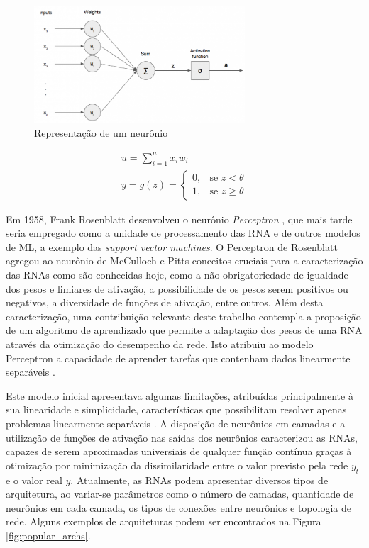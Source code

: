 \begin{figure}[ht]
	\centering
	\includegraphics[width=0.7\textwidth]{img/perceptron.png}
	\caption{Representação de um neurônio}
	\label{fig:neuronio}
\end{figure}

\begin{gather}\label{eq:funcao_neuronio}
	u = \sum_{i=1}^n x_i w_i\\
	y = g(z) =
		\begin{cases}
			0, & \text{se } z < \theta\\
			1, & \text{se } z \geq \theta
		\end{cases}
\end{gather}



Em 1958, Frank Rosenblatt desenvolveu o neurônio \emph{Perceptron} \cite{rosenblatt1958perceptron}, que mais tarde seria empregado como a unidade de processamento das RNA e de outros modelos de ML, a exemplo das \emph{support vector machines}. O Perceptron de Rosenblatt agregou ao neurônio de McCulloch e Pitts conceitos cruciais para a caracterização das RNAs como são conhecidas hoje, como a não obrigatoriedade de igualdade dos pesos e limiares de ativação, a possibilidade de os pesos serem positivos ou negativos, a diversidade de funções de ativação, entre outros. Além desta caracterização, uma contribuição relevante deste trabalho contempla a proposição de um algoritmo de aprendizado que permite a adaptação dos pesos de uma RNA através da otimização do desempenho da rede. Isto atribuiu ao modelo Perceptron a capacidade de aprender tarefas que contenham dados linearmente separáveis \cite{braga2000redes}.

Este modelo inicial apresentava algumas limitações, atribuídas principalmente à sua linearidade e simplicidade, características que possibilitam resolver apenas problemas linearmente separáveis \cite{braga2000redes}. A disposição de neurônios em camadas e a utilização de funções de ativação nas saídas dos neurônios caracterizou as RNAs, capazes de serem aproximadas universiais de qualquer função contínua graças à otimização por minimização da dissimilaridade entre o valor previsto pela rede $y_t$ e o valor real $y$. Atualmente, as RNAs podem apresentar diversos tipos de arquitetura, ao variar-se parâmetros como o número de camadas, quantidade de neurônios em cada camada, os tipos de conexões entre neurônios e topologia de rede. Alguns exemplos de arquiteturas podem ser encontrados na Figura \ref{fig:popular_archs}.

